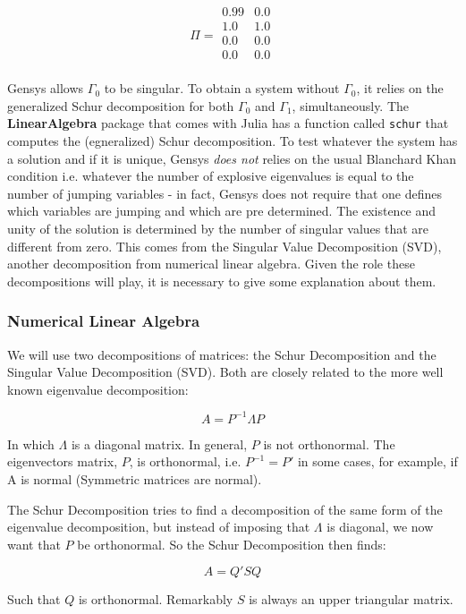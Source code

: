 \documentclass[12pt,a4paper]{article}
\begin{document}
\begin{equation}
\Pi = 
\begin{array}{cc}
0.99 & 0.0 \\
1.0 & 1.0 \\
0.0 & 0.0 \\
0.0 & 0.0 \\
\end{array}
\end{equation}


Gensys allows $\Gamma_0$ to be singular. To obtain a system without $\Gamma_0$, it relies on the generalized Schur decomposition for both $\Gamma_0$ and $\Gamma_1$, simultaneously. The \textbf{LinearAlgebra} package that comes with Julia has a function called \texttt{schur} that computes the (egneralized) Schur decomposition. To test whatever the system has a solution and if it is unique, Gensys \emph{does not} relies on the usual Blanchard Khan condition i.e. whatever the number of explosive eigenvalues is equal to the number of jumping variables - in fact, Gensys does not require that one defines which variables are jumping and which are pre determined. The existence and unity of the solution is determined by the number of singular values that are different from zero. This comes from the Singular Value Decomposition (SVD), another decomposition from numerical linear algebra. Given the role these decompositions will play, it is necessary to give some explanation about them.

\subsubsection{Numerical Linear Algebra}
We will use two decompositions of matrices: the Schur Decomposition and the Singular Value Decomposition (SVD). Both are closely related to the more well known eigenvalue decomposition:

\[
A = P^{-1}\Lambda P
\]

In which $\Lambda$ is a diagonal matrix. In general, $P$ is not orthonormal. The eigenvectors matrix, $P$, is orthonormal, i.e. $P^{-1} = P'$ in some cases, for example, if A is normal (Symmetric matrices are normal).

The Schur Decomposition tries to find a decomposition	of the same form of the eigenvalue decomposition, but instead of imposing that $\Lambda$ is diagonal, we now want that $P$ be orthonormal. So the Schur Decomposition then finds:

\[
A = Q'SQ
\]

Such that $Q$ is orthonormal. Remarkably $S$ is always an upper triangular matrix.
\end{document}
